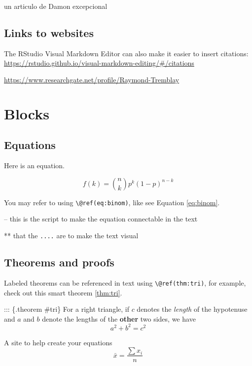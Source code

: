 \documentclass[
]{book}
\theoremstyle{definition}
\theoremstyle{definition}
\theoremstyle{definition}
\theoremstyle{definition}
\theoremstyle{remark}
\begin{document}
un articulo de Damon excepcional \citep{damon2000review}

\hypertarget{links-to-websites}{%
\section{Links to websites}\label{links-to-websites}}

The RStudio Visual Markdown Editor can also make it easier to insert citations: \url{https://rstudio.github.io/visual-markdown-editing/\#/citations}

\url{https://www.researchgate.net/profile/Raymond-Tremblay}

\hypertarget{blocks}{%
\chapter{Blocks}\label{blocks}}

\hypertarget{equations}{%
\section{Equations}\label{equations}}

Here is an equation.

\begin{equation} 
  f\left(k\right) = \binom{n}{k} p^k\left(1-p\right)^{n-k}
  \label{eq:binom} 
\end{equation}

You may refer to using \texttt{\textbackslash{}@ref(eq:binom)}, like see Equation \eqref{eq:binom}.

-- this is the script to make the equation connectable in the text

** that the \texttt{....} are to make the text visual

\hypertarget{theorems-and-proofs}{%
\section{Theorems and proofs}\label{theorems-and-proofs}}

Labeled theorems can be referenced in text using \texttt{\textbackslash{}@ref(thm:tri)}, for example, check out this smart theorem \ref{thm:tri}.

::: \{.theorem \#tri\}
For a right triangle, if \(c\) denotes the \emph{length} of the hypotenuse
and \(a\) and \(b\) denote the lengths of the \textbf{other} two sides, we have
\[a^2 + b^2 = c^2\]

A site to help create your equations \[\bar{x}=\frac{\sum x_{i}}{n}\]
\end{document}
